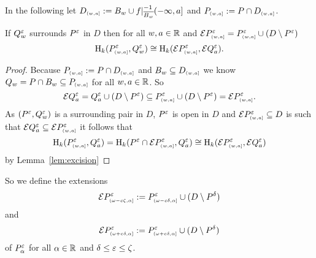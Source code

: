 

In the following let $D\subi{w,a} := B_w\cup f\rest_{\comp{B_w}}^{-1}(-\infty,a]$ and $P\subi{w,a} := P\cap D\subi{w,a}$.

\begin{lemma}\label{lem:extension_apply}
  If $Q_w^\e$ surrounds $P^\e$ in $D$ then for all $w,a\in\R$ and $\ext{P\subi{w,a}^\e} = P\subi{w,a}^\e \cup (D\setminus P^\e)$
  \[\hom_k(P\subi{w,a}^\e, Q_w^\e)\cong \hom_k(\ext{P\subi{w,a}^\e}, \ext{Q^\e_a}).\]
\end{lemma}
\begin{proof}
  Because $P\subi{w,a} := P\cap D\subi{w,a}$ and $B_w\subseteq D\subi{w,a}$ we know $Q_w = P\cap B_w \subseteq P\subi{w,a}$ for all $w,a\in\R$.
  So
  \[\ext{Q^\e_a} = Q^\e_a\cup (D\setminus P^\e) \subseteq P\subi{w,a}^\e \cup (D\setminus P^\e) = \ext{P\subi{w,a}^\e}.\]
  As $(P^\e, Q_w^\e)$ is a surrounding pair in $D$, $P^\e$ is open in $D$ and $\ext{P\subi{w,a}^\e}\subseteq D$ is such that $\ext{Q^\e_a}\subseteq \ext{P\subi{w,a}^\e}$ it follows that
  \[\hom_k(P\subi{w,a}^\e, Q^\e_a) = \hom_k(P^\e\cap \ext{P\subi{w,a}^\e}, Q^\e_a) \cong\hom_k(\ext{P\subi{w,a}^\e}, \ext{Q^\e_a})\]
  by Lemma~\ref{lem:excision}
\end{proof}

So we define the extensions
\[\ext{P^\e\subi{\omega-c\zeta, \alpha}} := P^\e\subi{\omega-c\delta, \alpha}\cup (D\setminus P^\of)\]
and
\[\ext{P^\e\subi{\omega+c\delta, \alpha}} := P^\e\subi{\omega+c\delta, \alpha}\cup (D\setminus P^\of)\]
of $P^\e_\alpha$ for all $\alpha\in\R$ and $\delta\leq\e\leq\zeta$.


